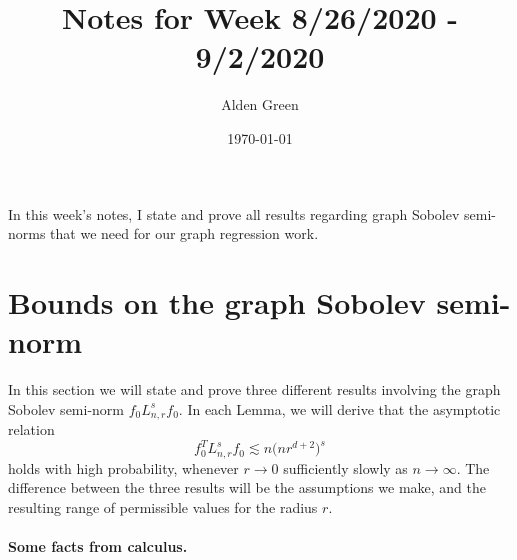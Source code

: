 \documentclass{article}
\newcommand{\1}{\mathbf{1}}
\newcommand{\Lap}{L}
\theoremstyle{alden}
\theoremstyle{aldenthm}
\theoremstyle{definition}
\theoremstyle{remark}
\begin{document}
\title{Notes for Week 8/26/2020 - 9/2/2020}
\author{Alden Green}
\date{\today}
\maketitle

In this week's notes, I state and prove all results regarding graph Sobolev semi-norms that we need for our graph regression work. 

\section{Bounds on the graph Sobolev semi-norm}
In this section we will state and prove three different results involving the graph Sobolev semi-norm $f_0 \Lap_{n,r}^s f_0$. In each Lemma, we will derive that the asymptotic relation
\begin{equation*}
f_0^T \Lap_{n,r}^s f_0 \lesssim n \bigl(nr^{d + 2}\bigr)^s
\end{equation*}
holds with high probability, whenever $r \to 0$ sufficiently slowly as $n \to \infty$. The difference between the three results will be the assumptions we make, and the resulting range of permissible values for the radius $r$. 

\paragraph{Some facts from calculus.}
\end{document}
